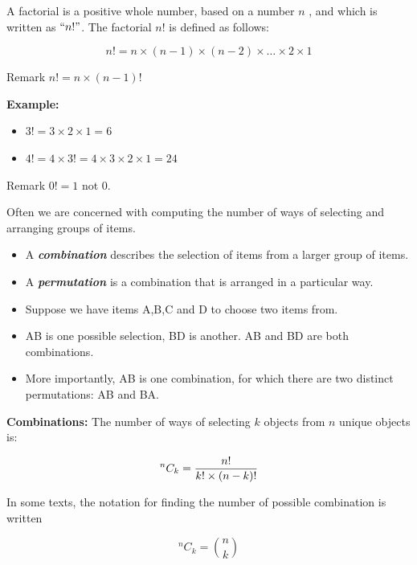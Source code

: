 \documentclass[12pt]{report}
\begin{document}

A factorial is a positive whole number, based on a number $n$ , and which is written as $``n!"$. The factorial $n!$ is defined as follows:

\[n!  =n \times (n-1) \times (n-2) \times \ldots \times 2 \times 1 \]

Remark $n!  =n \times (n-1)!$\\ \bigskip

\textbf{ Example: }

\begin{itemize}
	\item $3!  = 3 \times 2  \times 1 = 6 $
	
	\item $4!  = 4 \times 3! = 4 \times 3 \times 2 \times 1 = 24$
\end{itemize}
Remark $0! = 1$ not $0$.



{\Large
	
	
	Often we are concerned with computing the number of ways of selecting and arranging groups of items. \begin{itemize} \item  A \textbf{\emph{combination}} describes the selection of items from a larger group of items.  \item A \textbf{\emph{permutation}} is a combination that is arranged in a particular way.
	\end{itemize}
	
	\bigskip
	\begin{itemize}
		\item Suppose we have items A,B,C and D to choose two items from.
		\item AB is one possible selection, BD is another. AB and BD are both combinations.
		\item More importantly, AB is one combination, for which there are two distinct permutations: AB and BA.
	\end{itemize}
}

{\Large
	
	\textbf{Combinations: }
	The number of ways of selecting $k$ objects from $n$ unique objects is:
	
	\[ ^n C_k = {n!  \over k! \times (n-k)!} \]
	
	In some texts, the notation for finding the number of possible combination is written
	
	\[ ^n C_k =  {n \choose k} \]
	
}
\end{document}
